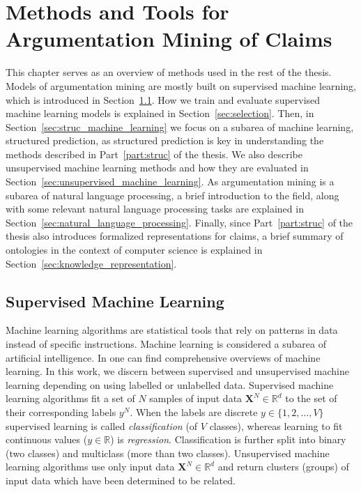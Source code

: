 \chapter{Methods and Tools for Argumentation Mining of Claims}
\label{chap:methods}

This chapter serves as an overview of methods used in the rest of the thesis.
Models of argumentation mining are mostly built on supervised machine learning,
which is introduced in Section~\ref{sec:unstruc_machine_learning}.  How we
train and evaluate supervised machine learning models is explained in
Section~\ref{sec:selection}.  Then, in Section~\ref{sec:struc_machine_learning}
we focus on a subarea of machine learning, structured prediction, as structured
prediction is key in understanding the methods described in
Part~\ref{part:struc} of the thesis. We also describe unsupervised machine
learning methods and how they are evaluated in
Section~\ref{sec:unsupervised_machine_learning}.  As argumentation mining is a
subarea of natural language processing, a brief introduction to the field,
along with some relevant natural language processing tasks are explained in
Section~\ref{sec:natural_language_processing}. Finally, since 
Part~\ref{part:struc} of the thesis
also introduces formalized representations for claims, a
brief summary of ontologies in the context of computer science is
explained in Section~\ref{sec:knowledge_representation}. 

\section{Supervised Machine Learning}
\label{sec:unstruc_machine_learning}

Machine learning algorithms are statistical tools that rely on patterns in data
instead of specific instructions. Machine learning is considered a subarea of
artificial intelligence. In \citep{russell2016artificial, bishop2006pattern} one can
find comprehensive overviews of machine learning.  In this work, we discern between
supervised and unsupervised machine learning depending on using labelled or
unlabelled data.  
Supervised machine learning algorithms fit a set of $N$
samples of input data $\textbf{X}^N \in \mathbb{R}^d$ to the set of their
corresponding labels $y^N $. When the labels are discrete $y \in \{1, 2, \dots ,
V\}$ supervised learning is called \emph{classification} (of $V$ classes), whereas
learning to fit continuous values ($y \in \mathbb{R}$) is \emph{regression}. 
Classification is further split into binary (two classes) and multiclass (more
than two classes).  Unsupervised machine learning algorithms use only input
data $\textbf{X}^N \in \mathbb{R}^d$ and return clusters (groups) of input data
which have been determined to be related. 

